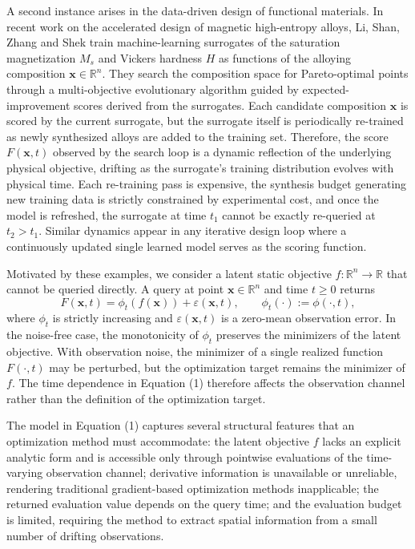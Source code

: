 \documentclass[11pt,a4paper]{article}
\begin{document}
A second instance arises in the data-driven design of functional materials. In recent work on the accelerated design of magnetic high-entropy alloys, Li, Shan, Zhang and Shek train machine-learning surrogates of the saturation magnetization $M_s$ and Vickers hardness $H$ as functions of the alloying composition $\bm{x}\in\mathbb{R}^{n}$. They search the composition space for Pareto-optimal points through a multi-objective evolutionary algorithm guided by expected-improvement scores derived from the surrogates. Each candidate composition $\bm{x}$ is scored by the current surrogate, but the surrogate itself is periodically re-trained as newly synthesized alloys are added to the training set. Therefore, the score $F(\bm{x},t)$ observed by the search loop is a dynamic reflection of the underlying physical objective, drifting as the surrogate's training distribution evolves with physical time. Each re-training pass is expensive, the synthesis budget generating new training data is strictly constrained by experimental cost, and once the model is refreshed, the surrogate at time $t_1$ cannot be exactly re-queried at $t_2>t_1$. Similar dynamics appear in any iterative design loop where a continuously updated single learned model serves as the scoring function.

Motivated by these examples, we consider a latent static objective $f:\mathbb{R}^n\to\mathbb{R}$ that cannot be queried directly. A query at point $\bm{x}\in\mathbb{R}^n$ and time $t\ge 0$ returns
\begin{equation}
    F(\bm{x},t)=\phi_t(f(\bm{x}))+\varepsilon(\bm{x},t), \qquad \phi_t(\cdot):=\phi(\cdot,t),
\end{equation}
where $\phi_t$ is strictly increasing and $\varepsilon(\bm{x},t)$ is a zero-mean observation error. In the noise-free case, the monotonicity of $\phi_t$ preserves the minimizers of the latent objective. With observation noise, the minimizer of a single realized function $F(\cdot,t)$ may be perturbed, but the optimization target remains the minimizer of $f$. The time dependence in Equation (1) therefore affects the observation channel rather than the definition of the optimization target.

The model in Equation (1) captures several structural features that an optimization method must accommodate: the latent objective $f$ lacks an explicit analytic form and is accessible only through pointwise evaluations of the time-varying observation channel; derivative information is unavailable or unreliable, rendering traditional gradient-based optimization methods inapplicable; the returned evaluation value depends on the query time; and the evaluation budget is limited, requiring the method to extract spatial information from a small number of drifting observations.
\end{document}
